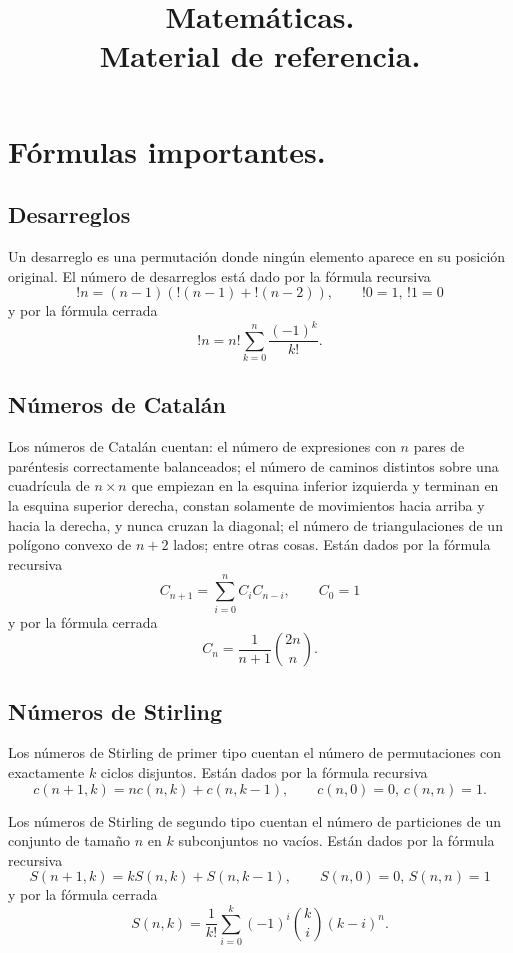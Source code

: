 \documentclass[12pt, letterpaper, twoside]{article}
\title{Matemáticas.\\
	  \large Material de referencia.}
\author{}
\date{}
\begin{document}
\maketitle

\tableofcontents

\newpage

\section{Fórmulas importantes.}

\subsection{Desarreglos}

Un desarreglo es una permutación donde ningún elemento aparece en su posición original. El número de desarreglos está dado por la fórmula recursiva 
$$!n = (n - 1)(!(n - 1) + !(n - 2)), \qquad !0 = 1, \, !1 = 0$$ 
y por la fórmula cerrada
$$!n = n! \sum_{k=0}^n \frac{(-1)^k}{k!}.$$

\subsection{Números de Catalán}

Los números de Catalán cuentan: el número de expresiones con $n$ pares de paréntesis correctamente balanceados; el número de caminos distintos sobre una cuadrícula de $n \times n$ que empiezan en la esquina inferior izquierda y terminan en la esquina superior derecha, constan solamente de movimientos hacia arriba y hacia la derecha, y nunca cruzan la diagonal; el número de triangulaciones de un polígono convexo de $n + 2$ lados; entre otras cosas. Están dados por la fórmula recursiva
$$C_{n+1} = \sum_{i=0}^n C_iC_{n-i}, \qquad C_0 = 1$$
y por la fórmula cerrada
$$C_n = \frac{1}{n + 1}\binom{2n}{n}.$$

\subsection{Números de Stirling}

Los números de Stirling de primer tipo cuentan el número de permutaciones con exactamente $k$ ciclos disjuntos. Están dados por la fórmula recursiva
$$c(n + 1, k) = nc(n, k) + c(n, k - 1), \qquad c(n, 0) =  0, \, c(n, n) = 1.$$

Los números de Stirling de segundo tipo cuentan el número de particiones de un conjunto de tamaño $n$ en $k$ subconjuntos no vacíos. Están dados por la fórmula recursiva
$$S(n + 1, k) = kS(n, k) + S(n, k - 1), \qquad S(n, 0) =  0, \, S(n, n) = 1$$
y por la fórmula cerrada
$$S(n, k) = \frac{1}{k!} \sum_{i=0}^k (-1)^i \binom{k}{i}(k - i)^n.$$
\end{document}
